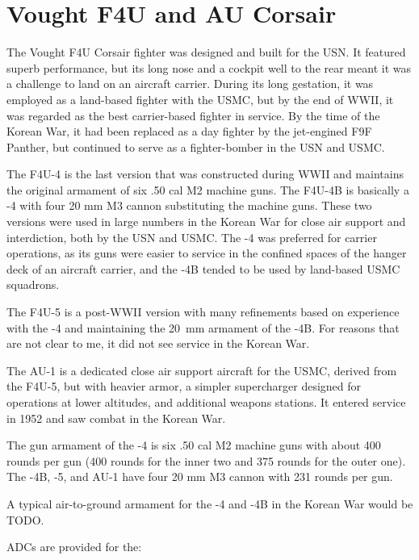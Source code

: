 \section{Vought F4U and AU Corsair}

The Vought F4U Corsair fighter was designed and built for the USN. It featured superb performance, but its long nose and a cockpit well to the rear meant it was a challenge to land on an aircraft carrier. During its long gestation, it was employed as a land-based fighter with the USMC, but by the end of WWII, it was regarded as the best carrier-based fighter in service. By the time of the Korean War, it had been replaced as a day fighter by the jet-engined F9F Panther, but continued to serve as a fighter-bomber in the USN and USMC.

The F4U-4 is the last version that was constructed during WWII and maintains the original armament of six .50 cal M2 machine guns. The F4U-4B is basically a -4 with four 20 mm M3 cannon substituting the machine guns. These two versions were used in large numbers in the Korean War for close air support and interdiction, both by the USN and USMC. The -4 was preferred for carrier operations, as its guns were easier to service in the confined spaces of the hanger deck of an aircraft carrier, and the -4B tended to be used by land-based USMC squadrons.

The F4U-5 is a post-WWII version with many refinements based on experience with the -4 and maintaining the 20~mm armament of the -4B. For reasons that are not clear to me, it did not see service in the Korean War.

The AU-1 is a dedicated close air support aircraft for the USMC, derived from the F4U-5, but with heavier armor, a simpler supercharger designed for operations at lower altitudes, and additional weapons stations. It entered service in 1952 and saw combat in the Korean War.

The gun armament of the -4 is six .50 cal M2 machine guns with about 400 rounds per gun (400 rounds for the inner two and 375 rounds for the outer one). The -4B, -5, and AU-1 have four 20 mm M3 cannon with 231 rounds per gun. 

A typical air-to-ground armament for the -4 and -4B in the Korean War would be TODO. 

ADCs are provided for the:
\begin{adclist}
\end{adclist}
